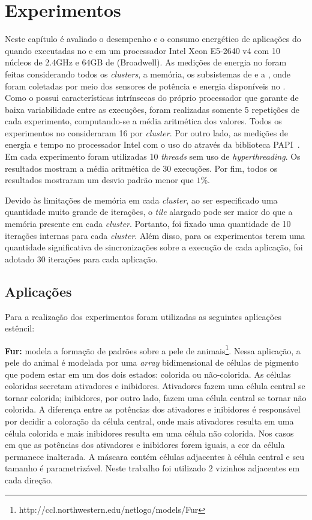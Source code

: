 \chapter{Experimentos}
\label{cha:experimentos}

Neste capítulo é avaliado o desempenho e o consumo energético de aplicações
\stencil do \pskel quando executadas no \mppa e em um processador Intel Xeon
E5-2640 v4 com 10 núcleos de 2.4GHz e 64GB de \ram (Broadwell). As medições de energia no \mppa
foram feitas considerando todos os \textit{clusters}, a memória, os subsistemas
de \es e a \noc, onde foram coletadas por meio dos sensores de potência e
energia disponíveis no \mppa. Como o \mppa possui características intrínsecas do
próprio processador que garante de baixa variabilidade entre as execuções, foram
realizadas somente 5 repetições de cada experimento, computando-se a média
aritmética dos valores. Todos os experimentos no \mppa consideraram 16
\pes por \textit{cluster}. Por outro lado, as medições de energia e tempo no
processador Intel com o uso do \rapl através da biblioteca PAPI~\cite{papi12}.
Em cada experimento foram utilizadas 10 \textit{threads} sem uso de
\textit{hyperthreading}. Os resultados mostram a média aritmética de 30
execuções. Por fim, todos os resultados mostraram um desvio padrão menor que
$1$\%.

Devido às limitações de memória em cada \textit{cluster}, ao ser especificado
uma quantidade muito grande de iterações, o \textit{tile} alargado pode ser
maior do que a memória presente em cada \textit{cluster}. Portanto, foi fixado
uma quantidade de 10 iterações internas para cada \textit{cluster}. Além disso,
para os experimentos terem uma quantidade significativa de sincronizações sobre
a execução de cada aplicação, foi adotado 30 iterações para cada aplicação.

\section{Aplicações \stencil}
\label{cha:aplicacoes}

Para a realização dos experimentos foram utilizadas as seguintes aplicações estêncil:

\textbf{Fur:} modela a formação de padrões sobre a pele de animais\footnote{{http://ccl.northwestern.edu/netlogo/models/Fur}}. Nessa aplicação, a pele do animal é modelada por uma \textit{array} bidimensional de células de pigmento que podem estar em um dos dois estados: colorida ou não-colorida. As células coloridas secretam ativadores e inibidores. Ativadores fazem uma célula central se tornar colorida; inibidores, por outro lado, fazem uma célula central se tornar não colorida.
A diferença entre as potências dos ativadores e inibidores é responsável por decidir a coloração da célula central, onde mais ativadores resulta em uma célula colorida e mais inibidores resulta em uma célula não colorida. Nos casos em que as potências dos ativadores e inibidores forem iguais, a cor da célula permanece inalterada. A máscara contém células adjacentes à célula central e seu tamanho é parametrizável. Neste trabalho foi utilizado $2$ vizinhos adjacentes em cada direção.


